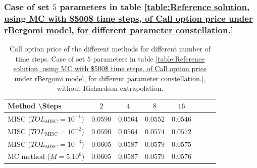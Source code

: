\subsubsection{Case of set $5$ parameters in table \ref{table:Reference solution, using MC with $500$ time steps, of Call option price under rBergomi model, for different parameter constellation.}}\label{sec:Case of set 5 parameters}
\FloatBarrier
\begin{table}[h!]
	\centering
	\begin{tabular}{l*{6}{c}r}
		Method \textbackslash  Steps            & $2$ & $4$ & $8$ & $16$ &   \\
		\hline
		MISC ($TOL_{\text{MISC}}=10^{-1}$)  & $0.0590$ &$0.0564$& $0.0552$ & $0.0546$   \\
		MISC ($TOL_{\text{MISC}}=10^{-2}$)  &$0.0590$ &$0.0564$ & $0.0574$ & $0.0572$  \\
		
		MISC ($TOL_{\text{MISC}}=10^{-3}$)  & $0.0605$ & $0.0587$ & $0.0579$ & $0.0575$  \\
%		
		\hline
		MC method ($M=5.10^{6}$)   & $0.0605$ & $0.0587$  & $0.0579$ & $0.0576$ \\		
		
		\hline
	\end{tabular}
	\caption{ Call option price of the different methods for different number of time steps. Case of set $5$ parameters in table \ref{table:Reference solution, using MC with $500$ time steps, of Call option price under rBergomi model, for different parameter constellation.}, without Richardson extrapolation.}
	\label{table: Call option price of the different methods for different number of time steps. Case set 5}
\end{table}

